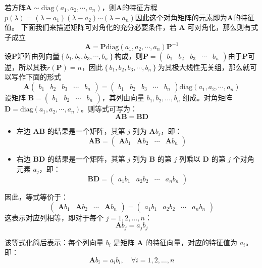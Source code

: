 若方阵$\mathbf{A}\sim \text{diag}(a_{1},a_2,\cdots,a_n)$，则$\mathbf{A}$的特征方程$p(\lambda)=(\lambda-a_1)(\lambda-a_2)\cdots(\lambda-a_n)$因此这个对角矩阵的元素即为$\mathbf{A}$的特征值。
下面我们来描述矩阵可对角化的充分必要条件，若 $\mathbf{A}$ 可对角化，那么则有式子成立$$\mathbf{A}=\mathbf{P}\text{diag}(a_{1},a_2,\cdots,a_n)\mathbf{P}^{-1}$$设$\mathbf{P}$矩阵由列向量$\left\{ b_1,b_2,b_3,\cdots,b_n \right\}$构成，则$\mathbf{P}=\begin{pmatrix}
	b_1 & b_2 & b_3 & \cdots & b_n
\end{pmatrix}$由于$\mathbf{P}$可逆，所以其秩$r(\mathbf{P})=n$，因此$\left\{ b_1,b_2,b_3,\cdots,b_n \right\}$为其极大线性无关组，那么就可以写作下面的形式$$\mathbf{A}\begin{pmatrix}
	b_1 & b_2 & b_3 & \cdots & b_n
\end{pmatrix}=\begin{pmatrix}
	b_1 & b_2 & b_3 & \cdots & b_n
\end{pmatrix}\text{diag}(a_{1},a_2,\cdots,a_n)$$设矩阵 $\mathbf{B} = \begin{pmatrix} b_1 & b_2 & \cdots & b_n \end{pmatrix}$，其列由向量 $b_1, b_2, \ldots, b_n$ 组成。对角矩阵 $\mathbf{D} = \text{diag}(a_1, a_2, \cdots, a_n)$。则等式可写为：
$$
\mathbf{A} \mathbf{B} = \mathbf{B} \mathbf{D}
$$
\begin{itemize}
	\item 左边 $\mathbf{A} \mathbf{B}$ 的结果是一个矩阵，其第 $j$ 列为 $\mathbf{A} b_j$，即：
  $$
  \mathbf{A} \mathbf{B} = \begin{pmatrix} \mathbf{A} b_1 & \mathbf{A} b_2 & \cdots & \mathbf{A} b_n \end{pmatrix}
  $$
  	\item 右边 $\mathbf{B} \mathbf{D}$ 的结果是一个矩阵，其第 $j$ 列为 $\mathbf{B}$ 的第 $j$ 列乘以 $\mathbf{D}$ 的第 $j$ 个对角元素 $a_j$，即：
  $$
  \mathbf{B} \mathbf{D} = \begin{pmatrix} a_1 b_1 & a_2 b_2 & \cdots & a_n b_n \end{pmatrix}
  $$
\end{itemize}

因此，等式等价于：
$$
\begin{pmatrix} \mathbf{A} b_1 & \mathbf{A} b_2 & \cdots & \mathbf{A} b_n \end{pmatrix} = \begin{pmatrix} a_1 b_1 & a_2 b_2 & \cdots & a_n b_n \end{pmatrix}
$$
这表示对应列相等，即对于每个 $j = 1, 2, \ldots, n$：
$$
\mathbf{A} b_j = a_j b_j
$$

该等式化简后表示：每个列向量 $b_i$ 是矩阵 $\mathbf{A}$ 的特征向量，对应的特征值为 $a_i$。即：
$$
\mathbf{A} b_i = a_i b_i, \quad \forall i = 1, 2, \ldots, n
$$